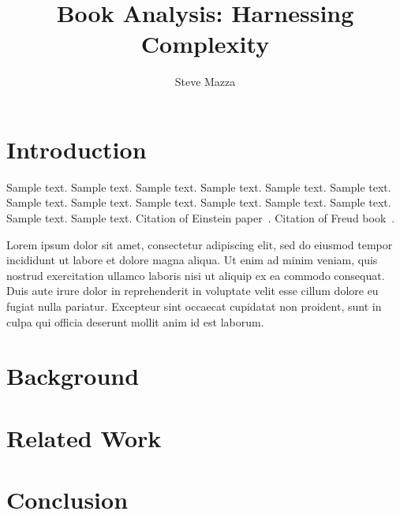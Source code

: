 \documentclass[jou,apacite]{apa6}
\title{Book Analysis: Harnessing Complexity}
\author{Steve Mazza}
\affiliation{Naval Postgraduate School}
\begin{document}
\maketitle    
                        
\section{Introduction}
Sample text. Sample text. Sample text. Sample text. Sample text. Sample text. 
Sample text. Sample text. Sample text. Sample text. Sample text. Sample text. 
Sample text. Sample text. Citation of Einstein paper~\cite{Axelrod}. Citation of Freud book~\cite{Axelrod}.

Lorem ipsum dolor sit amet, consectetur adipiscing elit, sed do eiusmod tempor incididunt ut labore et dolore magna aliqua. Ut enim ad minim veniam, quis nostrud exercitation ullamco laboris nisi ut aliquip ex ea commodo consequat. Duis aute irure dolor in reprehenderit in voluptate velit esse cillum dolore eu fugiat nulla pariatur. Excepteur sint occaecat cupidatat non proident, sunt in culpa qui officia deserunt mollit anim id est laborum.

\section{Background}

\section{Related Work}

\section{Conclusion}


\end{document}
